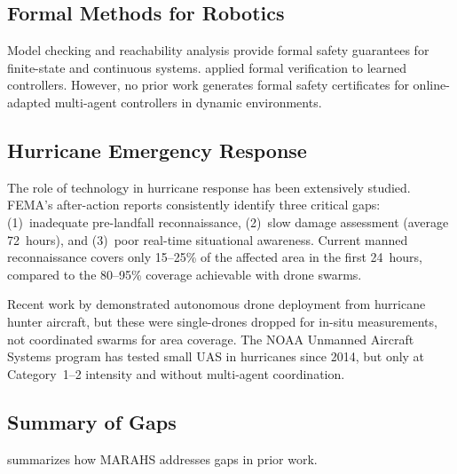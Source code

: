 \documentclass[12pt,a4paper,twocolumn]{article}
\begin{document}
\subsection{Formal Methods for Robotics}
\label{sec:related_formal}

Model checking \citep{Clarke1999} and reachability analysis \citep{Althoff2015} provide formal safety guarantees for finite-state and continuous systems. \citet{Althoff2015} applied formal verification to learned controllers. However, no prior work generates formal safety certificates for online-adapted multi-agent controllers in dynamic environments.

\subsection{Hurricane Emergency Response}
\label{sec:related_hurricane}

The role of technology in hurricane response has been extensively studied. FEMA's after-action reports \citep{FEMA2019} consistently identify three critical gaps: (1)~inadequate pre-landfall reconnaissance, (2)~slow damage assessment (average 72~hours), and (3)~poor real-time situational awareness. Current manned reconnaissance covers only 15--25\% of the affected area in the first 24~hours, compared to the 80--95\% coverage achievable with drone swarms.

Recent work by \citep{Holland2010} demonstrated autonomous drone deployment from hurricane hunter aircraft, but these were single-drones dropped for in-situ measurements, not coordinated swarms for area coverage. The NOAA Unmanned Aircraft Systems program has tested small UAS in hurricanes since 2014, but only at Category~1--2 intensity and without multi-agent coordination.

\subsection{Summary of Gaps}

 summarizes how MARAHS addresses gaps in prior work.
\end{document}
